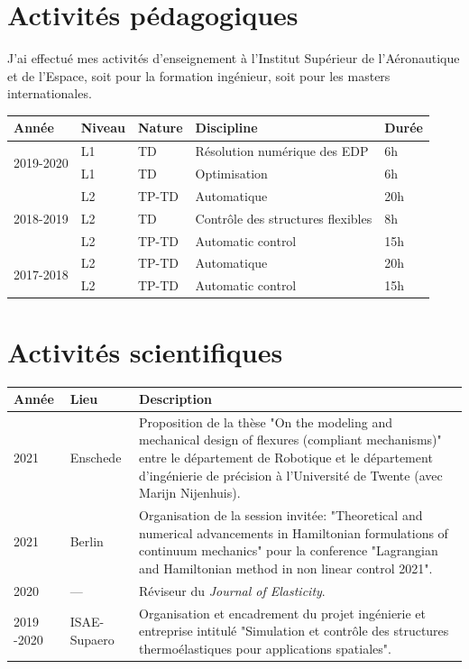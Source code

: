\documentclass[12pt,a4paper,sans]{moderncv} %
\begin{document}


\section{Activités pédagogiques}
J'ai effectué mes activités d'enseignement à l'Institut Supérieur de l'Aéronautique et de l'Espace, soit pour la formation ingénieur, soit pour les masters internationales.

\begin{tabular}{p{}p{}p{}p{}p{}}
	\hline
	Année & Niveau & Nature  & Discipline & Durée  \\
	\hline
	\multirow{2}{*}{2019-2020} & L1 & TD &  Résolution numérique des EDP & 6h \\
							   & L1 & TD &  Optimisation & 6h \\
	\hline
	\multirow{3}{*}{2018-2019} & L2  & TP-TD  & Automatique & 20h \\
							   & L2  & TD     & Contrôle des structures flexibles & 8h \\
							   & L2  & TP-TD  & Automatic control & 15h \\
	\hline
	\multirow{2}{*}{2017-2018} & L2  & TP-TD  & Automatique & 20h \\
							   & L2  & TP-TD  & Automatic control & 15h \\				   
	\hline
\end{tabular}


\section{Activités scientifiques}

\begin{tabular}{p{}p{}p{}}
	Année & Lieu & Description  \\
	\hline
	2021 & Enschede & Proposition de la thèse "On the modeling and mechanical design of flexures (compliant mechanisms)" entre le département de Robotique et le département d'ingénierie de précision à l'Université de Twente (avec Marijn Nijenhuis). \\
	\hline
	2021  & Berlin & Organisation de la session invitée: "Theoretical and numerical advancements in Hamiltonian formulations of continuum mechanics" pour la conference "Lagrangian and Hamiltonian method in non linear control 2021". \\
	\hline
	2020 & --- & Réviseur du \textit{Journal of Elasticity}. \\
	\hline
	2019 -2020 & ISAE-Supaero & Organisation et encadrement du projet ingénierie et entreprise intitulé "Simulation et contrôle des structures thermoélastiques pour
	applications spatiales". \\
	\hline
\end{tabular}
\end{document}

